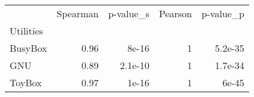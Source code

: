 \begin{tabular}{lrrrr}
\toprule
 & Spearman & p-value_s & Pearson & p-value_p \\
Utilities &  &  &  &  \\
\midrule
BusyBox & 0.96 & 8e-16 & 1 & 5.2e-35 \\
GNU & 0.89 & 2.1e-10 & 1 & 1.7e-34 \\
ToyBox & 0.97 & 1e-16 & 1 & 6e-45 \\
\bottomrule
\end{tabular}
